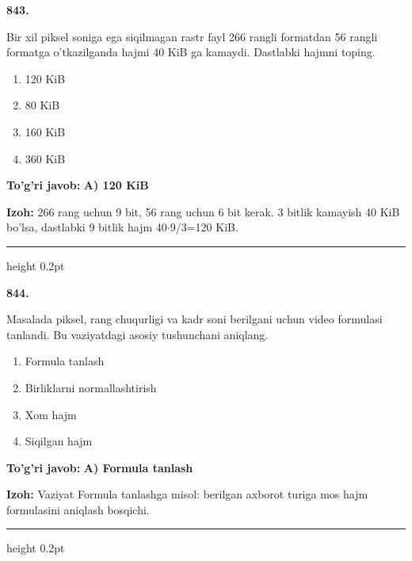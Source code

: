 \documentclass[10pt,a4paper,oneside]{article}
\begin{document}
\noindent\textbf{\color{ink}843.}
\par
Bir xil piksel soniga ega siqilmagan rastr fayl 266 rangli formatdan 56 rangli formatga o'tkazilganda hajmi 40 KiB ga kamaydi. Dastlabki hajmni toping.
\begin{enumerate}[label=\Alph*),leftmargin=9mm]
\item 120 KiB
\item 80 KiB
\item 160 KiB
\item 360 KiB
\end{enumerate}
\begin{tcolorbox}[enhanced,breakable,colback=teal!4,colframe=teal!50!black,boxrule=0.5pt,arc=1.1mm,left=3mm,right=3mm,top=1.7mm,bottom=1.7mm,before skip=2mm,after skip=2mm]
\textbf{\color{teal}To'g'ri javob:} \textbf{A) 120 KiB}
\par\smallskip
\textbf{Izoh:} 266 rang uchun 9 bit, 56 rang uchun 6 bit kerak. 3 bitlik kamayish 40 KiB bo'lsa, dastlabki 9 bitlik hajm 40\ensuremath{\cdot}9/3=120 KiB.
\end{tcolorbox}
\vspace{2mm}\hrule height 0.2pt \vspace{3mm}

\noindent\textbf{\color{ink}844.}
\par
Masalada piksel, rang chuqurligi va kadr soni berilgani uchun video formulasi tanlandi. Bu vaziyatdagi asosiy tushunchani aniqlang.
\begin{enumerate}[label=\Alph*),leftmargin=9mm]
\item Formula tanlash
\item Birliklarni normallashtirish
\item Xom hajm
\item Siqilgan hajm
\end{enumerate}
\begin{tcolorbox}[enhanced,breakable,colback=teal!4,colframe=teal!50!black,boxrule=0.5pt,arc=1.1mm,left=3mm,right=3mm,top=1.7mm,bottom=1.7mm,before skip=2mm,after skip=2mm]
\textbf{\color{teal}To'g'ri javob:} \textbf{A) Formula tanlash}
\par\smallskip
\textbf{Izoh:} Vaziyat Formula tanlashga misol: berilgan axborot turiga mos hajm formulasini aniqlash bosqichi.
\end{tcolorbox}
\vspace{2mm}\hrule height 0.2pt \vspace{3mm}
\end{document}
